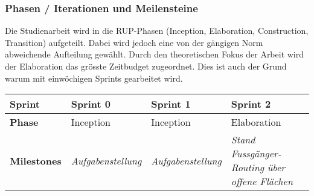 \subsubsection{Phasen / Iterationen und Meilensteine}
\label{sub:Phasen / Iterationen und Meilensteine}

Die Studienarbeit wird in die \acs{RUP}-Phasen (Inception, Elaboration, Construction, Transition) aufgeteilt. Dabei wird jedoch eine von der gängigen Norm abweichende Aufteilung gewählt. Durch den theoretischen Fokus der Arbeit wird der Elaboration das grösste Zeitbudget zugeordnet. Dies ist auch der Grund warum mit einwöchigen Sprints gearbeitet wird.

\begin{landscape}
\begin{longtable}{l p{5.5cm} p{5.5cm} p{5.5cm}} 
        \toprule
        \textbf{Sprint}
                                & \textbf{Sprint 0}
                                & \textbf{Sprint 1}
                                & \textbf{Sprint 2} \\
        
        \midrule
        \textbf{Phase}
                                & Inception
                                & Inception
                                & Elaboration \\
        
        \textbf{Milestones} 	
                                & \textit{Aufgabenstellung}
                                & \textit{Aufgabenstellung}
                                & \textit{Stand Fussgänger-Routing über offene Flächen}  \\
        

\end{longtable}
\end{landscape}
